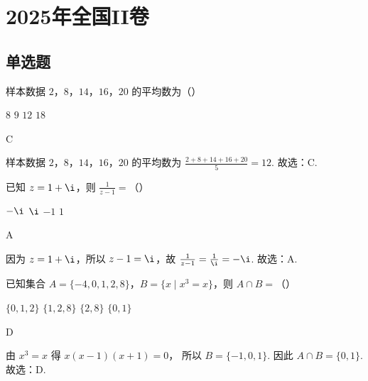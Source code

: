 \chapter{2025年全国II卷}

\section{单选题}

\begin{problem}
样本数据 \(2\)，\(8\)，\(14\)，\(16\)，\(20\) 的平均数为（\quad）

\choices
    {\(8\)}
    {\(9\)}
    {\(12\)}
    {\(18\)}
\end{problem}

\begin{answer}
C
\end{answer}

\begin{solution}
样本数据 \(2\)，\(8\)，\(14\)，\(16\)，\(20\) 的平均数为
\(\frac{2+8+14+16+20}{5}=12\).
故选：C.
\end{solution}

\begin{problem}
已知 \(z=1+\i\)，则 \(\frac{1}{z-1}=\)（\quad）

\choices
    {\(-\i\)}
    {\(\i\)}
    {\(-1\)}
    {\(1\)}
\end{problem}

\begin{answer}
A
\end{answer}

\begin{solution}
因为 \(z=1+\i\)，所以 \(z-1=\i\)，故
\(\frac{1}{z-1}=\frac{1}{\i}=-\i\).
故选：A.
\end{solution}

\begin{problem}
已知集合 \(A=\{-4,0,1,2,8\}\)，\(B=\{x \mid x^3=x\}\)，则 \(A\cap B=\)（\quad）

\choices
    {\(\{0,1,2\}\)}
    {\(\{1,2,8\}\)}
    {\(\{2,8\}\)}
    {\(\{0,1\}\)}
\end{problem}

\begin{answer}
D
\end{answer}

\begin{solution}
由 \(x^3=x\) 得
\(x(x-1)(x+1)=0\)，
所以 \(B=\{-1,0,1\}\). 因此
\(A\cap B=\{0,1\}\).
故选：D.
\end{solution}


